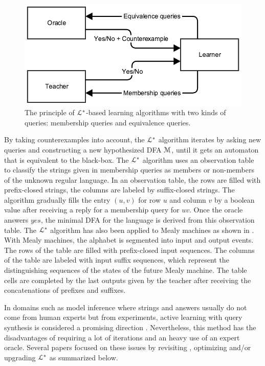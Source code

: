 \begin{figure}[h]
    \begin{center}
        \includegraphics[width=1.0\linewidth]{figures/angluin.png}
    \end{center}

    \caption{The principle of $\EuScript{L}^*$-based learning
    algorithms with two kinds of queries: membership queries and
    equivalence queries.}
    \label{fig:angluin}
\end{figure}

By taking counterexamples into account, the $\EuScript{L}^*$
algorithm iterates by asking new queries and constructing a new
hypothesized DFA $\EuScript{M}$, until it gets an automaton that
is equivalent to the black-box. The $\EuScript{L}^*$ algorithm
uses an observation table to classify the strings given in
membership queries as members or non-members of the unknown
regular language. In an observation table, the rows are filled
with prefix-closed strings, the columns are labeled by
suffix-closed strings. The algorithm gradually fills the entry
$(u,v)$ for row $u$ and column $v$ by a boolean value after
receiving a reply for a membership query for $uv$. Once the
oracle answers $yes$, the minimal DFA for the language is derived
from this observation table. The $\EuScript{L}^*$ algorithm has
also been applied to Mealy machines as shown in
\cite{DBLP:phd/de/Niese2003,steffen11}.  With Mealy machines, the
alphabet is segmented into input and output events. The rows of
the table are filled with prefix-closed input sequences. The
columns of the table are labeled with input suffix sequences,
which represent the distinguishing sequences of the states of the
future Mealy machine. The table cells are completed by the last
outputs given by the teacher after receiving the concatenations
of prefixes and suffixes.

In domains such as model inference where strings and answers
usually do not come from human experts but from experiments,
active learning with query synthesis is considered a promising
direction \cite{settles.tr09}. Nevertheless, this method has the
disadvantages of requiring a lot of iterations and an heavy use
of an expert oracle. Several papers focused on these issues by
revisiting \cite{regularinfBerg06,regularinfBerg08}, optimizing
and/or upgrading $\EuScript{L}^*$
\cite{Raffelt:2005:LLA:1081180.1081189,irfan12} as summarized
below.

